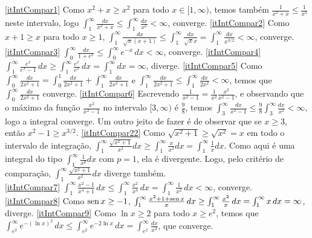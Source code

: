 \begin{Solution}{11.9}
\eqref{itIntCompar1} Como $x^2+x\geq x^2$ para
todo $x\in [1,\infty)$, temos também $\frac{1}{x^2+x}\leq \frac{1}{x^2}$ neste
intervalo, logo
$\int_1^\infty\frac{dx}{x^2+x}\leq
\int_1^\infty\frac{dx}{x^2}<\infty$, converge.
\eqref{itIntCompar2} Como $x+1\geq x$ para todo $x\geq 1$,
$\int_1^\infty
\frac{dx}{\sqrt{x}(x+1)}\leq
\int_1^\infty \frac{dx}{\sqrt{x}x}= \int_1^\infty \frac{dx}{x^{3/2}}<\infty$,
converge.
\eqref{itIntCompar3} $\int_0^\infty \frac{dx}{1+e^x}\leq \int_0^\infty
e^{-x}\,dx<\infty$, converge.
\eqref{itIntCompar4} $\int_1^\infty \frac{e^x}{e^x-1}\,dx\geq
\int_1^\infty \frac{e^x}{e^x}\,dx=\int_1^\infty dx=\infty$, diverge.
\eqref{itIntCompar5} Como
$\int_0^\infty\frac{dx}{2x^2+1}=\int_0^1\frac{dx}{2x^2+1}
 +\int_1^\infty\frac{dx}{2x^2+1}$ e
$\int_1^\infty\frac{dx}{2x^2+1}\leq
\int_1^\infty\frac{dx}{2x^2}<\infty$, temos que $\int_0^\infty\frac{dx}{2x^2+1}$
converge.
\eqref{itIntCompar6} Escrevendo
$\tfrac{1}{x^2-1}=\tfrac{1}{x^2}\tfrac{x^2}{x^2-1}$, e observando que o máximo
da função $\tfrac{x^2}{x^2-1}$ no intervalo $[3,\infty)$ é $\tfrac98$, temos
$\int_3^\infty\frac{dx}{x^2-1}\leq \tfrac98
\int_3^\infty\frac{dx}{x^2}<\infty$, logo a integral converge.
Um outro jeito de fazer é de observar que se $x\geq 3$, então $x^2-1\geq x^{3/2}$.
\eqref{itIntCompar22}
Como $\sqrt{x^2+1}\geq \sqrt{x^2}=x$ em todo o intervalo de integração,
$\int_1^\infty\frac{\sqrt{x^2+1}}{x^2}dx\geq
\int_1^\infty\frac{x}{x^2}dx=\int_1^\infty\frac{1}{x}dx$.
Como aqui é uma integral do tipo $\int_1^\infty\frac{1}{x^p}dx$ com $p=1$, ela é
divergente. Logo, pelo critério de comparação,
$\int_1^\infty\frac{\sqrt{x^2+1}}{x^2}dx$ {diverge} também.\\
\eqref{itIntCompar7} $\int_1^\infty\frac{x^2-1}{x^4+1}\,dx\leq
\int_1^\infty\frac{x^2}{x^4}\,dx=\int_1^\infty\frac{1}{x^2}\,dx<\infty$,
converge.
\eqref{itIntCompar8} Como $\operatorname{sen} x\geq -1$,
$\int_1^\infty\frac{x^2+1+\operatorname{sen} x}{x}\,dx\geq
\int_1^\infty\frac{x^2}{x}\,dx
=\int_1^\infty x\,dx=\infty$, diverge.
\eqref{itIntCompar9}
Como $\ln x \geq 2$ para todo $x\geq e^2$, temos que
$\int_{e^2}^\infty e^{-(\ln x)^2}\,dx\leq
\int_{e^2}^\infty e^{-2\ln x}\,dx=\int_{e^2}^\infty\frac{dx}{x^2}$, que converge.
\end{Solution}
